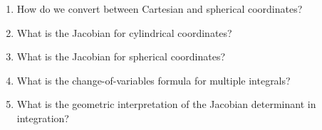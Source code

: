 \begin{enumerate}
\item How do we convert between Cartesian and spherical coordinates?

\item What is the Jacobian for cylindrical coordinates?

\item What is the Jacobian for spherical coordinates?

\item What is the change-of-variables formula for multiple integrals?

\item What is the geometric interpretation of the Jacobian determinant in integration?

\end{enumerate}
